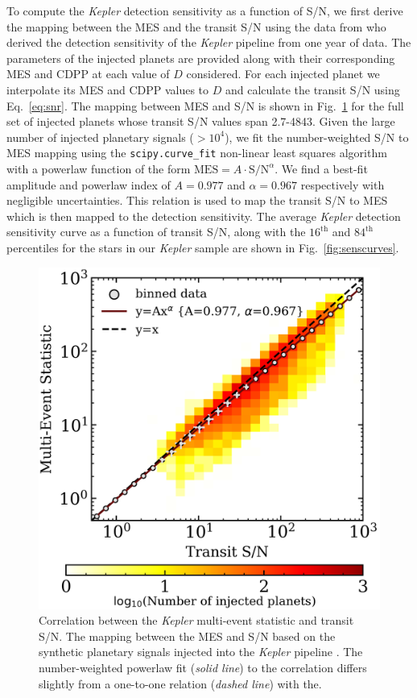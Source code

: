 \documentclass[twocolumn]{emulateapj}
\newcommand{\kepler}[1]{\emph{Kepler}#1}
\begin{document}
To compute the \kepler{} detection sensitivity as a function of S/N, we first
derive the mapping between the MES and the transit S/N using the data from \cite{christiansen15} who
derived the detection sensitivity of the \kepler{} pipeline from one year of data. 
The parameters of the injected planets are provided along with their corresponding MES and CDPP at each value of
$D$ considered. For each injected planet we interpolate its MES and CDPP values to $D$ and calculate
the transit S/N using Eq.~\ref{eq:snr}. The mapping between MES and S/N is shown in Fig.~\ref{fig:messnr}
for the full set of injected planets whose transit S/N values span 2.7-4843. Given the large number of injected planetary
signals ($>10^4$), we fit the number-weighted S/N to MES mapping using the \texttt{scipy.curve\_fit} non-linear least
squares algorithm with a powerlaw function of the form $\text{MES} = A\cdot \text{S/N}^{\alpha}$. We find a best-fit
amplitude and powerlaw index of $A=0.977$ and $\alpha=0.967$ respectively with negligible uncertainties.
This relation is used to map the transit S/N to MES
which is then mapped to the detection sensitivity. The average \kepler{} detection sensitivity curve as a function of
transit S/N, along with the $16^{\text{th}}$ and $84^{\text{th}}$ percentiles for the stars in our \kepler{} sample
are shown in Fig.~\ref{fig:senscurves}.


\begin{figure}
  \centering
  \includegraphics[width=0.98\hsize]{figures/MES_SNR.png}
  \caption{Correlation between the \kepler{} multi-event statistic and transit S/N. The mapping between the MES and
    S/N based on the synthetic planetary signals injected into the \kepler{} pipeline \citep{christiansen15}.
    The number-weighted powerlaw fit (\emph{solid line}) to the correlation differs slightly from a one-to-one relation
    (\emph{dashed line}) with the.}  
  \label{fig:messnr}
\end{figure}
\end{document}
